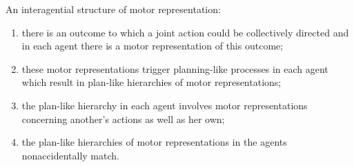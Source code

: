 \documentclass[12pt]{extarticle}
\begin{document}
\begin{multicols*}{3}
An interagential structure of motor representation:
\begin{enumerate} \item there is an outcome to
which a joint action could be collectively directed and in each agent there is a motor representation
of this outcome; \item these motor representations trigger planning-like processes in each agent which
result in plan-like hierarchies of motor representations; \item the plan-like hierarchy in each agent
involves motor representations concerning another's actions as well as her own; \item the plan-like
hierarchies of motor representations in the agents nonaccidentally match.
\end{enumerate}







\footnotesize


\end{multicols*}
\end{document}

